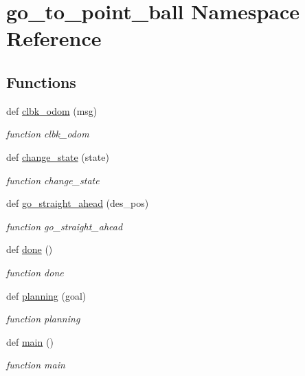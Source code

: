 \hypertarget{namespacego__to__point__ball}{}\section{go\+\_\+to\+\_\+point\+\_\+ball Namespace Reference}
\label{namespacego__to__point__ball}
\subsection*{Functions}
\begin{DoxyCompactItemize}
\item 
def \hyperlink{namespacego__to__point__ball_a8b53c165c87e66822f50ab5daebc14dc}{clbk\+\_\+odom} (msg)
\begin{DoxyCompactList}\small\item\em function clbk\+\_\+odom \end{DoxyCompactList}\item 
def \hyperlink{namespacego__to__point__ball_ac5839fd3601d15749a1e1a28939b2c68}{change\+\_\+state} (state)
\begin{DoxyCompactList}\small\item\em function change\+\_\+state \end{DoxyCompactList}\item 
def \hyperlink{namespacego__to__point__ball_aecbf76a67251ff6a3a0840bb61e1c581}{go\+\_\+straight\+\_\+ahead} (des\+\_\+pos)
\begin{DoxyCompactList}\small\item\em function go\+\_\+straight\+\_\+ahead \end{DoxyCompactList}\item 
def \hyperlink{namespacego__to__point__ball_ab92c8b4240f09ff0b5d960c748ade799}{done} ()
\begin{DoxyCompactList}\small\item\em function done \end{DoxyCompactList}\item 
def \hyperlink{namespacego__to__point__ball_ab0e05a6be4adc81f80b5635d9bd692d1}{planning} (goal)
\begin{DoxyCompactList}\small\item\em function planning \end{DoxyCompactList}\item 
def \hyperlink{namespacego__to__point__ball_a4d4c016b6bb12c612710a2d39ade3465}{main} ()
\begin{DoxyCompactList}\small\item\em function main \end{DoxyCompactList}\end{DoxyCompactItemize}
